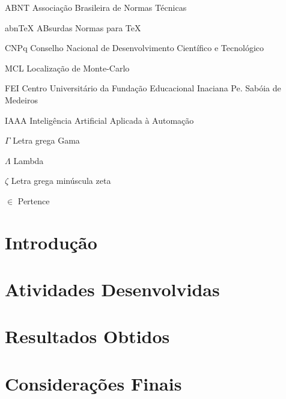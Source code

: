 \documentclass[
  12pt,       %
  oneside,
  a4paper,      %
  english,      %
  french,       %
  spanish,      %
  brazil,       %
  ]{abntex2}
\begin{document}
\listoffigures*
\cleardoublepage

\listoftables*
\cleardoublepage

\begin{siglas}
  \item[ABNT] Associação Brasileira de Normas Técnicas
  \item[abnTeX] ABsurdas Normas para TeX
  \item[CNPq] Conselho Nacional de Desenvolvimento Científico e Tecnológico
  \item[MCL] Localização de Monte-Carlo
  \item[FEI] Centro Universitário da Fundação Educacional Inaciana Pe. Sabóia de Medeiros
  \item[IAAA] Inteligência Artificial Aplicada à Automação
\end{siglas}

\begin{simbolos}
  \item[$ \Gamma $] Letra grega Gama
  \item[$ \Lambda $] Lambda
  \item[$ \zeta $] Letra grega minúscula zeta
  \item[$ \in $] Pertence
\end{simbolos}

\tableofcontents*
\cleardoublepage


\textual

\chapter{Introdução}

\chapter{Atividades Desenvolvidas}

\chapter{Resultados Obtidos}

\chapter{Considerações Finais}


\postextual


\end{document}
